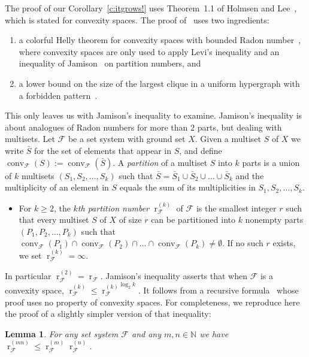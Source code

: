 \documentclass[11pt]{article}
\newcommand{\N}{\mathbb{N}}
\newcommand{\F}{\mathcal{F}}
\DeclareMathOperator{\conv}{conv}
\DeclareMathOperator{\rad}{r}
\newcommand{\defn}[1]{\emph{\color{violet}#1}}
\newtheorem{lemma}{Lemma}[section]
\begin{document}
%
The proof of our Corollary~\ref{c:itgrows!} uses Theorem~1.1 of Holmsen and Lee~\cite{Holmsen2021}, which is stated for convexity spaces. The proof of~\cite[Theorem~1.1]{Holmsen2021} uses two ingredients:
%
\begin{enumerate}
\item a colorful Helly theorem for convexity spaces with bounded Radon number~\cite[Theorem~2.2]{Holmsen2021}, where convexity spaces are only used to apply Levi's inequality and an inequality of Jamison~\cite[Ineq.~(6)]{jamison1981partition} on partition numbers, and\medskip
%
\item a lower bound on the size of the largest clique in a uniform hypergraph with a forbidden pattern~\cite[Theorem~1.2]{Holmsen2020}.
\end{enumerate}
%
\noindent
This only leaves us with Jamison's inequality to examine. Jamison's inequality is about analogues of Radon numbers for more than $2$ parts, but dealing with multisets.
%
\medskip
%
Let $\F$ be a set system with ground set $X$. Given a multiset $S$ of $X$ we write $\bar S$ for the set of elements that appear in $S$, and define $\conv_\F(S) := \conv_\F(\bar S)$. A \defn{partition} of a multiset $S$ into $k$ parts is a union of $k$ multisets $(S_1, S_2, \ldots, S_k)$ such that $\bar S = \bar S_1 \cup \bar S_2 \cup \ldots \cup \bar S_k$ and the multiplicity of an element in $S$ equals the sum of its multiplicities in $S_1, S_2, \ldots, S_k$. 
%
\begin{itemize}
\item For $k \ge 2$, the \defn{$k$th partition number} $\rad^{(k)}_\F$ of $\F$ is the smallest integer $r$ such that every multiset $S$ of $X$ of size $r$ can be partitioned into $k$ nonempty parts $(P_1, P_2, \ldots, P_k)$ such that $\conv_{\F}(P_1) \cap \conv_{\F}(P_2) \cap \ldots  \cap \conv_{\F}(P_k)\neq \emptyset$. If no such $r$ exists, we set $\rad_\F^{(k)}=\infty$.
\end{itemize}
%
\noindent
In particular $\rad^{(2)}_\F = \rad_\F$. Jamison's inequality asserts that when $\F$ is a convexity space, $\rad^{(k)}_\F \le {\rad^{(k)}_\F}^{\log_2 k}$. It follows from a recursive formula~\cite[Theorem~1]{jamison1981partition} whose proof uses no property of convexity spaces. For completeness, we reproduce here the proof of a slightly simpler version of that inequality:
%
\begin{lemma}
  For any set system $\F$ and any $m,n \in \N$ we have $\rad^{(mn)}_\F \le \rad^{(m)}_\F\rad^{(n)}_\F$.
\end{lemma}
\end{document}
